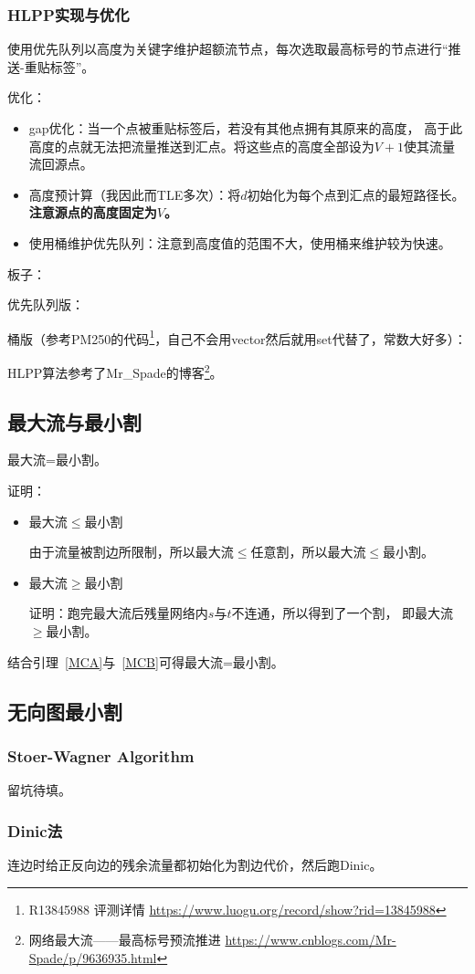 \subsubsection{HLPP实现与优化}

使用优先队列以高度为关键字维护超额流节点，每次选取最高标号的节点进行``推送-重贴标签''。

优化：
\begin{itemize}
	\item gap优化：当一个点被重贴标签后，若没有其他点拥有其原来的高度，
	高于此高度的点就无法把流量推送到汇点。将这些点的高度全部设为$V+1$使其流量
	流回源点。
	\item 高度预计算（我因此而TLE多次）：将$d$初始化为每个点到汇点的最短路径长。
	{\bfseries 注意源点的高度固定为$V$。}
	\item 使用桶维护优先队列：注意到高度值的范围不大，使用桶来维护较为快速。
\end{itemize}

板子：

优先队列版：


桶版（参考PM250的代码\footnote{
	R13845988 评测详情
	\url{https://www.luogu.org/record/show?rid=13845988}
}，自己不会用vector然后就用set代替了，常数大好多）：


HLPP算法参考了Mr\_Spade的博客\footnote{
	网络最大流——最高标号预流推进
	\url{https://www.cnblogs.com/Mr-Spade/p/9636935.html}
}。

\subsection{最大流与最小割}

\begin{theorem}\label{MFMCT}
	最大流=最小割。
\end{theorem}

证明：
\begin{itemize}
	\item
	\begin{lemma}\label{MCA}
		最大流$\leq$最小割
	\end{lemma}
	由于流量被割边所限制，所以最大流$\leq$任意割，所以最大流$\leq$最小割。
	\item
	\begin{lemma}\label{MCB}
		最大流$\geq$最小割
	\end{lemma}
	证明：跑完最大流后残量网络内$s$与$t$不连通，所以得到了一个割，
	即最大流$\geq$最小割。
\end{itemize}

结合引理~\ref{MCA}与~\ref{MCB}可得最大流=最小割。
\subsection{无向图最小割}
\subsubsection{Stoer-Wagner Algorithm}
留坑待填。
\subsubsection{Dinic法}
连边时给正反向边的残余流量都初始化为割边代价，然后跑Dinic。
